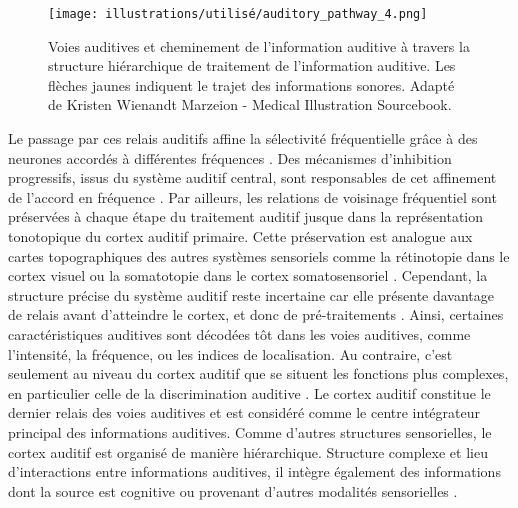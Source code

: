 \begin{figure*}[!t]
\center
\texttt{[image: illustrations/utilisé/auditory\_pathway\_4.png]}
\caption[Voies auditives et cheminement de l'information auditive]{Voies auditives et cheminement de l'information auditive à travers la structure hiérarchique de traitement de l'information auditive. Les flèches jaunes indiquent le trajet des informations sonores. Adapté de Kristen Wienandt Marzeion - Medical Illustration Sourcebook.}
\label{fig:chap2voieauditive}
\end{figure*}

Le passage par ces relais auditifs affine la sélectivité fréquentielle grâce à des neurones accordés à différentes fréquences \citep{isnard2016efficacite}. 
Des mécanismes d'inhibition progressifs, issus du système auditif central, sont responsables de cet affinement de l'accord en fréquence \citep{zhang1997corticofugal}. 
Par ailleurs, les relations de voisinage fréquentiel sont préservées à chaque étape du traitement auditif jusque dans la représentation tonotopique du cortex auditif primaire. 
Cette préservation est analogue aux cartes topographiques des autres systèmes sensoriels comme la rétinotopie dans le cortex visuel ou la somatotopie dans le cortex somatosensoriel \citep{king2009unraveling, lyon1996auditory, rauschecker1998cortical}. 
Cependant, la structure précise du système auditif reste incertaine car elle présente davantage de relais avant d'atteindre le cortex, et donc de pré-traitements \citep{king2009unraveling}. 
Ainsi, certaines caractéristiques auditives sont décodées tôt dans les voies auditives, comme l'intensité, la fréquence, ou les indices de localisation. 
Au contraire, c'est seulement au niveau du cortex auditif que se situent les fonctions plus complexes, en particulier celle de la discrimination auditive \citep{bathellier2012discrete}. 
Le cortex auditif constitue le dernier relais des voies auditives et est considéré comme le centre intégrateur principal des informations auditives. 
Comme d’autres structures sensorielles, le cortex auditif est organisé de manière hiérarchique. 
Structure complexe et lieu d’interactions entre informations auditives, il intègre également des informations dont la source est cognitive ou provenant d'autres modalités sensorielles \citep{lorenzi2016audition}. 

